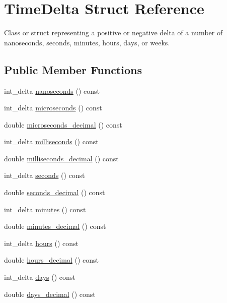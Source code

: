 \hypertarget{structTimeDelta}{\section{\-Time\-Delta \-Struct \-Reference}
\label{structTimeDelta}
}


\-Class or struct representing a positive or negative delta of a number of nanoseconds, seconds, minutes, hours, days, or weeks.  


\subsection*{\-Public \-Member \-Functions}
\begin{DoxyCompactItemize}
\item 
int\-\_\-delta \hyperlink{structTimeDelta_a27608357ea9addd1d0da20918f91d500}{nanoseconds} () const 
\item 
int\-\_\-delta \hyperlink{structTimeDelta_aa23b22a3b2a0f3f559e9dc343588b546}{microseconds} () const 
\item 
double \hyperlink{structTimeDelta_a44f7ddea28b3ca359d4cc3b1907fdf00}{microseconds\-\_\-decimal} () const 
\item 
int\-\_\-delta \hyperlink{structTimeDelta_a185b2278844ed43b2f5e1e8d16b11cb2}{milliseconds} () const 
\item 
double \hyperlink{structTimeDelta_a60a0277bc5fed5605850e4de83d4e50d}{milliseconds\-\_\-decimal} () const 
\item 
int\-\_\-delta \hyperlink{structTimeDelta_aa1fe6d8a690ab04b561400c09db673ef}{seconds} () const 
\item 
double \hyperlink{structTimeDelta_a19679d7e3057197bc7844b27f0b20cfb}{seconds\-\_\-decimal} () const 
\item 
int\-\_\-delta \hyperlink{structTimeDelta_a2856a4e761fc83822cc6987655035e76}{minutes} () const 
\item 
double \hyperlink{structTimeDelta_adcf5fed9ca5f425246658f252082806f}{minutes\-\_\-decimal} () const 
\item 
int\-\_\-delta \hyperlink{structTimeDelta_a5135596cbf7f7ef40001e25c5aa880b3}{hours} () const 
\item 
double \hyperlink{structTimeDelta_aaae58342e9d06c7c78e9b5dea5cafe02}{hours\-\_\-decimal} () const 
\item 
int\-\_\-delta \hyperlink{structTimeDelta_abad8a94a6c022af1a1871e452eca47ea}{days} () const 
\item 
double \hyperlink{structTimeDelta_aa73d3724b83ed4badb44b714d86124a2}{days\-\_\-decimal} () const 

\end{DoxyCompactItemize}
